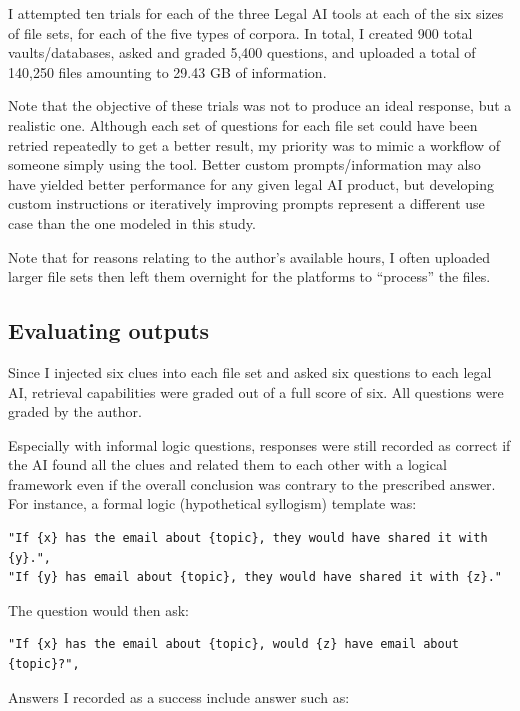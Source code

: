\documentclass[
]{article}
\begin{document}
I attempted ten trials for each of the three Legal AI tools at each of the six sizes of file sets, for each of the five types of corpora. In total, I created 900 total vaults/databases, asked and graded 5,400 questions, and uploaded a total of 140,250 files amounting to 29.43 GB of information.

Note that the objective of these trials was not to produce an ideal response, but a realistic one. Although each set of questions for each file set could have been retried repeatedly to get a better result, my priority was to mimic a workflow of someone simply using the tool. Better custom prompts/information may also have yielded better performance for any given legal AI product, but developing custom instructions or iteratively improving prompts represent a different use case than the one modeled in this study.

Note that for reasons relating to the author's available hours, I often uploaded larger file sets then left them overnight for the platforms to ``process'' the files.

\subsection{Evaluating outputs}\label{evaluating-outputs}

Since I injected six clues into each file set and asked six questions to each legal AI, retrieval capabilities were graded out of a full score of six. All questions were graded by the author.

Especially with informal logic questions, responses were still recorded as correct if the AI found all the clues and related them to each other with a logical framework even if the overall conclusion was contrary to the prescribed answer. For instance, a formal logic (hypothetical syllogism) template was:

\begin{verbatim}
"If {x} has the email about {topic}, they would have shared it with {y}.",
"If {y} has email about {topic}, they would have shared it with {z}."
\end{verbatim}

The question would then ask:

\begin{verbatim}
"If {x} has the email about {topic}, would {z} have email about {topic}?",
\end{verbatim}

Answers I recorded as a success include answer such as:
\end{document}
